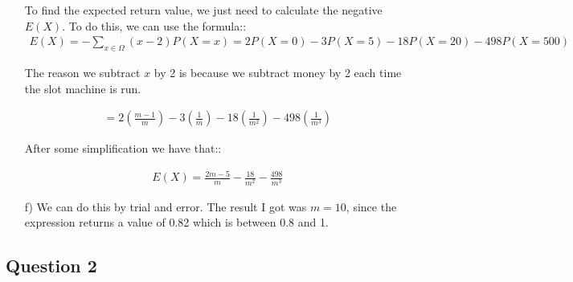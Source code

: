 \documentclass[12pt]{article}
\begin{document}
\begin{itemize}
    To find the expected return value, we just need to calculate the negative $E(X)$. To do this, we can use the formula::
    \begin{align*}
        E(X)=-\sum_{x\in\Omega}(x-2)P(X=x)=2P(X=0)-3P(X=5)-18P(X=20)-498P(X=500)
    \end{align*}

    The reason we subtract $x$ by 2 is because we subtract money by 2 each time the slot machine is run.

    \begin{align*}
        =2\left(\frac{m-1}{m}\right)-3\left(\frac{1}{m}\right)-18\left(\frac{1}{m^2}\right)-498\left(\frac{1}{m^3}\right)
    \end{align*}
    
    After some simplification we have that::

    \begin{align*}
        E(X)=\frac{2m-5}{m}-\frac{18}{m^2}-\frac{498}{m^3}
    \end{align*}


    \item[f)] We can do this by trial and error. The result I got was $m=10$, since the expression returns a value of 0.82 which is between 0.8 and 1.
\end{itemize}

\subsection*{Question 2}
\end{document}
